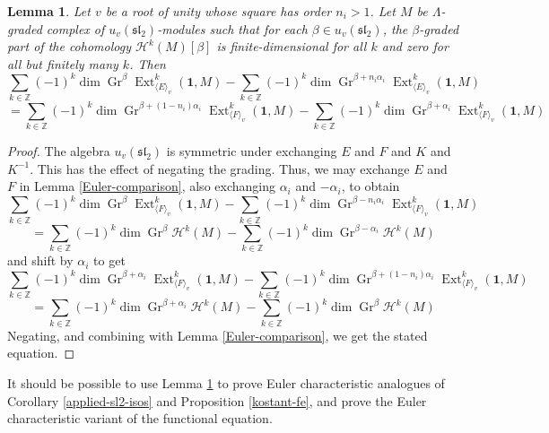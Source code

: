 \documentclass[11pt,letterpaper]{article}
\newtheorem{lemma}[theorem]{Lemma}
\theoremstyle{definition}
\theoremstyle{remark}
\numberwithin{equation}{section}
\theoremstyle{dotless}
\newcommand{\Gr}{\operatorname{Gr}}
\newcommand{\qv}{v}
\newcommand{\Ext}{\operatorname{Ext}}
\begin{document}
\begin{lemma}\label{Euler-fe} Let $v$ be a root of unity whose square has order $n_i>1$. Let $M$ be $\Lambda$-graded complex of $u_{\qv}(\mathfrak{sl}_2)$-modules such that for each $\beta \in u_{\qv}(\mathfrak{sl}_2)$, the $\beta$-graded part of the cohomology $\mathcal H^k(M) [\beta]$ is finite-dimensional for all $k$ and zero for all but finitely many $k$. Then
\[ \sum_{k \in \mathbb Z} (-1)^k \dim \Gr^\beta \Ext^k_{\langle E \rangle_{\qv}} (\mathbf 1, M )  - \sum_{k \in \mathbb Z} (-1)^k \dim \Gr^{\beta+   n_i \alpha_i}\Ext^k_{\langle E \rangle_{\qv}} (\mathbf 1, M )  \] \[ =  \sum_{k \in \mathbb Z} (-1)^k \dim \Gr^{\beta+(1-n_i) \alpha_i }  \Ext^k_{\langle F \rangle_{\qv}} (\mathbf 1, M )  - \sum_{k \in \mathbb Z} (-1)^k \dim \Gr^{\beta+\alpha_i} \Ext^k_{\langle F \rangle_{\qv}} (\mathbf 1, M ) \]
\end{lemma}

\begin{proof} The algebra $u_{\qv}(\mathfrak{sl}_2)$ is symmetric under exchanging $E$ and $F$ and $K$ and $K^{-1}$. This has the effect of negating the grading. Thus, we may exchange $E$ and $F$ in Lemma \ref{Euler-comparison}, also exchanging $\alpha_i$ and $-\alpha_i$, to obtain
\[ \sum_{k \in \mathbb Z} (-1)^k \dim  \Gr^\beta \Ext^k_{\langle F \rangle_{\qv}} (\mathbf 1, M )  - \sum_{k \in \mathbb Z} (-1)^k \dim  \Gr^{\beta-n_i\alpha_i} \Ext^k_{\langle F \rangle_{\qv}} (\mathbf 1, M )\] \[= \sum_{k \in \mathbb Z} (-1)^k \dim  \Gr^\beta \mathcal H^k (M) - \sum_{k\in \mathbb Z} (-1)^k \dim \Gr^{\beta- \alpha_i} \mathcal H^k (M) \]
and shift by $\alpha_i$ to get
\[ \sum_{k \in \mathbb Z} (-1)^k \dim \Gr^{\beta+\alpha_i}  \Ext^k_{\langle F \rangle_{\qv}} (\mathbf 1, M ) - \sum_{k \in \mathbb Z} (-1)^k \dim 
 \Gr^{\beta+ (1-n_i)\alpha_i} \Ext^k_{\langle F \rangle_{\qv}} (\mathbf 1, M )\] \[= \sum_{k \in \mathbb Z} (-1)^k \dim \Gr^{\beta+\alpha_i} \mathcal H^k (M)  - \sum_{k\in \mathbb Z} (-1)^k \dim \Gr^\beta \mathcal H^k (M) \]
Negating, and combining with Lemma \ref{Euler-comparison}, we get the stated equation.\end{proof}

It should be possible to use Lemma \ref{Euler-fe} to prove Euler characteristic analogues of Corollary \ref{applied-sl2-isos} and Proposition \ref{kostant-fe}, and prove the Euler characteristic variant of the functional equation.

\end{document}
